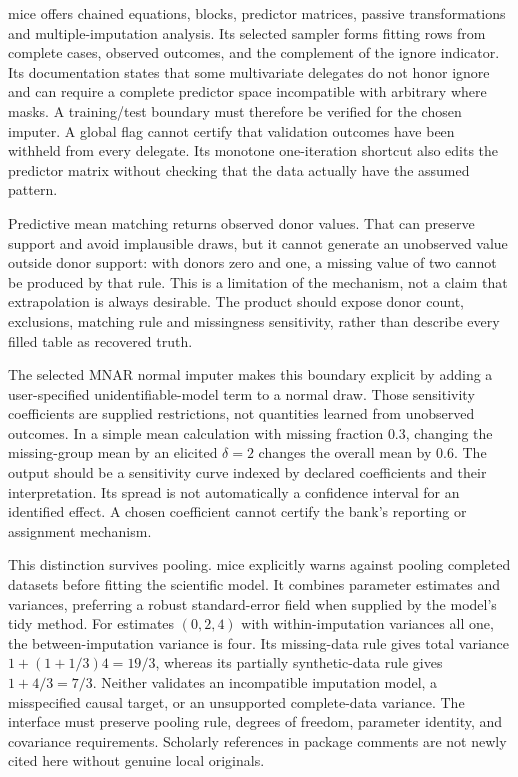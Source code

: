 mice offers chained equations, blocks, predictor matrices, passive transformations and multiple-imputation analysis. Its selected sampler forms fitting rows from complete cases, observed outcomes, and the complement of the ignore indicator. Its documentation states that some multivariate delegates do not honor ignore and can require a complete predictor space incompatible with arbitrary where masks. A training/test boundary must therefore be verified for the chosen imputer. A global flag cannot certify that validation outcomes have been withheld from every delegate. Its monotone one-iteration shortcut also edits the predictor matrix without checking that the data actually have the assumed pattern.~\citep{exec25_rtm_mice}

Predictive mean matching returns observed donor values. That can preserve support and avoid implausible draws, but it cannot generate an unobserved value outside donor support: with donors zero and one, a missing value of two cannot be produced by that rule. This is a limitation of the mechanism, not a claim that extrapolation is always desirable. The product should expose donor count, exclusions, matching rule and missingness sensitivity, rather than describe every filled table as recovered truth.~\citep{exec25_rtm_mice,exec25_rtm_choice}

The selected MNAR normal imputer makes this boundary explicit by adding a user-specified unidentifiable-model term to a normal draw. Those sensitivity coefficients are supplied restrictions, not quantities learned from unobserved outcomes. In a simple mean calculation with missing fraction $0.3$, changing the missing-group mean by an elicited $\delta=2$ changes the overall mean by $0.6$. The output should be a sensitivity curve indexed by declared coefficients and their interpretation. Its spread is not automatically a confidence interval for an identified effect. A chosen coefficient cannot certify the bank's reporting or assignment mechanism.~\citep{exec25_rtm_mice,exec25_rtm_choice}

This distinction survives pooling. mice explicitly warns against pooling completed datasets before fitting the scientific model. It combines parameter estimates and variances, preferring a robust standard-error field when supplied by the model's tidy method. For estimates $(0,2,4)$ with within-imputation variances all one, the between-imputation variance is four. Its missing-data rule gives total variance $1+(1+1/3)4=19/3$, whereas its partially synthetic-data rule gives $1+4/3=7/3$. Neither validates an incompatible imputation model, a misspecified causal target, or an unsupported complete-data variance. The interface must preserve pooling rule, degrees of freedom, parameter identity, and covariance requirements. Scholarly references in package comments are not newly cited here without genuine local originals.~\citep{exec25_rtm_mice,exec25_rtm_choice}

